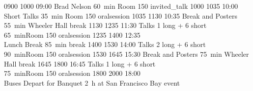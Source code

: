 \begin{timetable}
   {0900} {1000} {09:00 Brad Nelson}                 {60~min}                        {Room 150}                      {invited_talk}
   {1000} {1035} {10:00 Short Talks}                  {\vspace{1.5mm}35~min}          {\vspace{1.5mm}Room 150}        {oralsession}
   {1035} {1130} {10:35 Break and Posters}            {\vspace{1.5mm}55~min}          {Wheeler Hall}      {break}
   {1130} {1235} {11:30 Talks}                        {\vspace{-0.5em}1 long + 6 short\\65~min}{Room 150}             {oralsession}
   {1235} {1400} {12:35\\[0.2em]Lunch Break}          {85~min}                        {}                            {break}
   {1400} {1530} {14:00 Talks}                        {\vspace{-0.5em}2 long + 6 short\\90~min}{Room 150}             {oralsession}
   {1530} {1645} {15:30 Break and Posters}            {\vspace{1.5mm}75~min}          {Wheeler Hall}      {break}
   {1645} {1800} {16:45 Talks}                        {\vspace{-0.5em}1 long + 6 short\\75~min}{Room 150}             {oralsession}
   {1800} {2000} {18:00\\\vspace{0.3em}Buses Depart for Banquet}       {2~h}          {\vspace{-0.7em}at San Francisco Bay}     {event}




\end{timetable}
